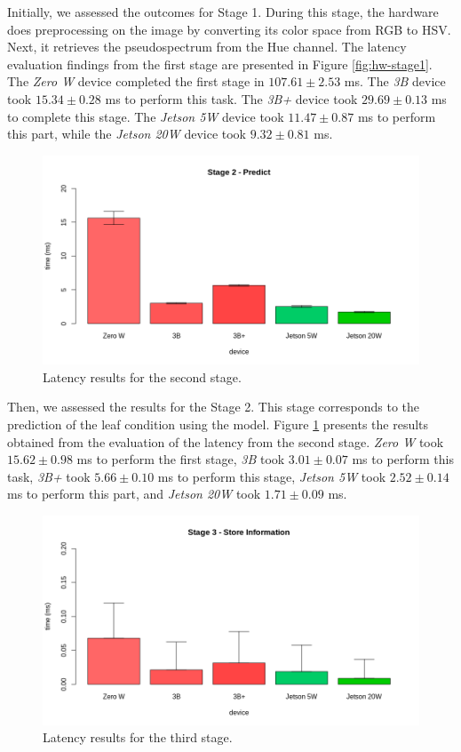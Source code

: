 Initially, we assessed the outcomes for Stage 1. During this stage, the hardware does preprocessing on the image by converting its color space from RGB to HSV. Next, it retrieves the pseudospectrum from the Hue channel. The latency evaluation findings from the first stage are presented in Figure \ref{fig:hw-stage1}. The \textit{Zero W} device completed the first stage in $107.61 \pm 2.53$ ms. The \textit{3B} device took $15.34 \pm 0.28$ ms to perform this task. The \textit{3B+} device took $29.69 \pm 0.13$ ms to complete this stage. The \textit{Jetson 5W} device took $11.47 \pm 0.87$ ms to perform this part, while the \textit{Jetson 20W} device took $9.32 \pm 0.81$ ms.

\begin{figure}[h]
    \centering
    \includegraphics[width = .8\linewidth]{Figures/HW-stage2.png}
    \caption{Latency results for the second stage.}
    \label{fig:hw-stage2}
\end{figure}

Then, we assessed the results for the Stage 2. This stage corresponds to the prediction of the leaf condition using the model. Figure \ref{fig:hw-stage2} presents the results obtained from the evaluation of the latency from the second stage. \textit{Zero W} took $15.62 \pm 0.98$ ms to perform the first stage, \textit{3B} took $3.01 \pm 0.07$ ms to perform this task, \textit{3B+} took $5.66 \pm 0.10$ ms to perform this stage, \textit{Jetson 5W} took $2.52 \pm 0.14$ ms to perform this part, and \textit{Jetson 20W} took $1.71 \pm 0.09$ ms.

\begin{figure}[h]
    \centering
    \includegraphics[width = .8\linewidth]{Figures/HW-stage3.png}
    \caption{Latency results for the third stage.}
    \label{fig:hw-stage3}
\end{figure}

